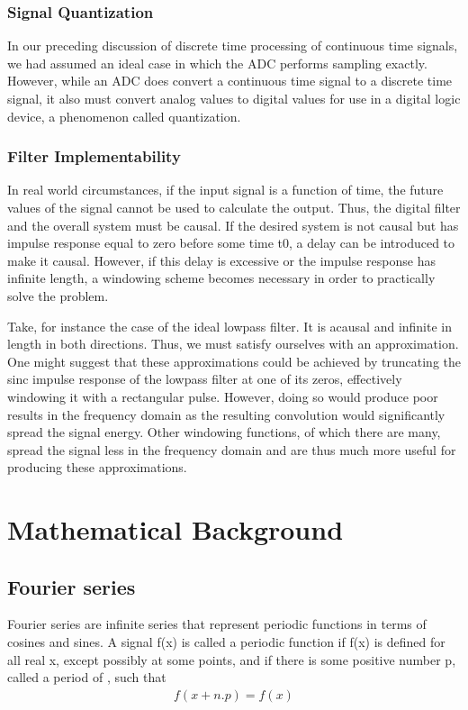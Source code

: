 \documentclass{article}
\begin{document}
\subsubsection{Signal Quantization}
In our preceding discussion of discrete time processing of continuous time signals, we had assumed an ideal case in which the ADC performs sampling exactly. However, while an ADC does convert a continuous time signal to a discrete time signal, it also must convert analog values to digital values for use in a digital logic device, a phenomenon called quantization. 

\subsubsection{Filter Implementability}
In real world circumstances, if the input signal is a function of time, the future values of the signal cannot be used to calculate the output. Thus, the digital filter and the overall system must be causal. If the desired system is not causal but has impulse response equal to zero before some time t0, a delay can be introduced to make it causal. However, if this delay is excessive or the impulse response has infinite length, a windowing scheme becomes necessary in order to practically solve the problem. 

Take, for instance the case of the ideal lowpass filter. It is acausal and infinite in length in both directions. Thus, we must satisfy ourselves with an approximation. One might suggest that these approximations could be achieved by truncating the sinc impulse response of the lowpass filter at one of its zeros, effectively windowing it with a rectangular pulse. However, doing so would produce poor results in the frequency domain as the resulting convolution would significantly spread the signal energy. Other windowing functions, of which there are many, spread the signal less in the frequency domain and are thus much more useful for producing these approximations.

\section{Mathematical Background}

\subsection{Fourier series}
Fourier series are infinite series that represent periodic functions in terms of cosines and sines. A signal f(x) is called a periodic function if f(x) is defined for all real x, except possibly at some points, and if there is some positive number p, called a period of , such that
\begin{equation}
\begin{aligned}
     f (x + n.p) = f (x)
\end{aligned}
\label{eq:periodic_function}
\end{equation}
\end{document}
